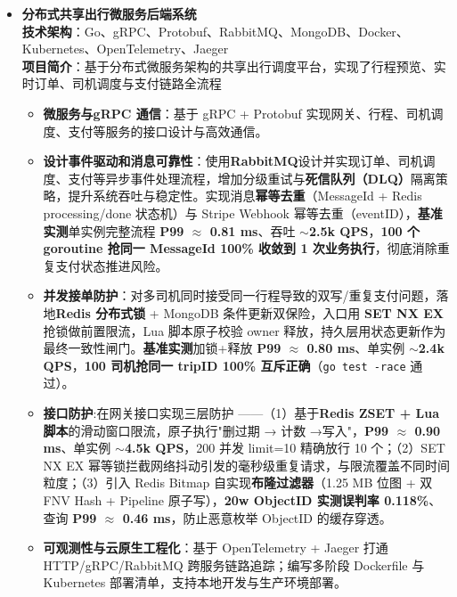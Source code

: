 \documentclass[zh]{resume}
\begin{document}
\begin{itemize}
  \item \textbf{分布式共享出行微服务后端系统} %
    \\ \textbf{技术架构}：Go、gRPC、Protobuf、RabbitMQ、MongoDB、Docker、Kubernetes、OpenTelemetry、Jaeger
    \\ \textbf{项目简介}：基于分布式微服务架构的共享出行调度平台，实现了行程预览、实时订单、司机调度与支付链路全流程
    \begin{itemize}
      \item \textbf{微服务与gRPC 通信}：基于 gRPC + Protobuf 实现网关、行程、司机调度、支付等服务的接口设计与高效通信。
      \item  \textbf{设计事件驱动和消息可靠性}：使用\textbf{RabbitMQ}设计并实现订单、司机调度、支付等异步事件处理流程，增加分级重试与\textbf{死信队列（DLQ）}隔离策略，提升系统吞吐与稳定性。实现消息\textbf{幂等去重}（MessageId + Redis processing/done 状态机）与 Stripe Webhook 幂等去重（eventID），\textbf{基准实测}单实例完整流程 \textbf{P99 $\approx$ 0.81 ms}、吞吐 \textbf{$\sim$2.5k QPS}，\textbf{100 个 goroutine 抢同一 MessageId 100\% 收敛到 1 次业务执行}，彻底消除重复支付状态推进风险。
      \item  \textbf{并发接单防护}：对多司机同时接受同一行程导致的双写/重复支付问题，落地\textbf{Redis 分布式锁} + MongoDB 条件更新双保险，入口用 \textbf{SET NX EX} 抢锁做前置限流，Lua 脚本原子校验 owner 释放，持久层用状态更新作为最终一致性闸门。\textbf{基准实测}加锁+释放 \textbf{P99 $\approx$ 0.80 ms}、单实例 \textbf{$\sim$2.4k QPS}，\textbf{100 司机抢同一 tripID 100\% 互斥正确}（\texttt{go test -race} 通过）。
      \item \textbf{接口防护}:在网关接口实现三层防护 ——（1）基于\textbf{Redis ZSET + Lua 脚本}的滑动窗口限流，原子执行"删过期 → 计数 →写入"，\textbf{P99 $\approx$ 0.90 ms}、单实例 \textbf{$\sim$4.5k QPS}，200 并发 limit=10 精确放行 10 个；（2）SET NX EX 幂等锁拦截网络抖动引发的毫秒级重复请求，与限流覆盖不同时间粒度；（3）引入 Redis Bitmap 自实现\textbf{布隆过滤器}（1.25 MB 位图 + 双 FNV Hash + Pipeline 原子写），\textbf{20w ObjectID 实测误判率 0.118\%}、查询 \textbf{P99 $\approx$ 0.46 ms}，防止恶意枚举 ObjectID 的缓存穿透。
      \item \textbf{可观测性与云原生工程化}：基于 OpenTelemetry + Jaeger 打通 HTTP/gRPC/RabbitMQ 跨服务链路追踪；编写多阶段 Dockerfile 与 Kubernetes 部署清单，支持本地开发与生产环境部署。
    \end{itemize}


\end{itemize}
\end{document}
